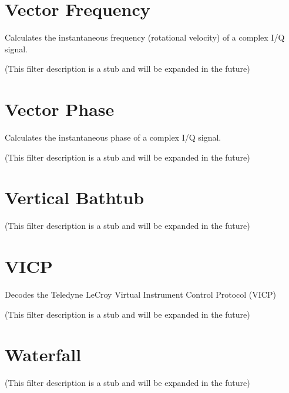 \pagebreak
\section{Vector Frequency}
\label{filter:vector_frequency}

Calculates the instantaneous frequency (rotational velocity) of a complex I/Q signal.

(This filter description is a stub and will be expanded in the future)

\pagebreak
\section{Vector Phase}

Calculates the instantaneous phase of a complex I/Q signal.

(This filter description is a stub and will be expanded in the future)

\pagebreak
\section{Vertical Bathtub}

(This filter description is a stub and will be expanded in the future)

\pagebreak
\section{VICP}

Decodes the Teledyne LeCroy Virtual Instrument Control Protocol (VICP)

(This filter description is a stub and will be expanded in the future)

\pagebreak
\section{Waterfall}

(This filter description is a stub and will be expanded in the future)

